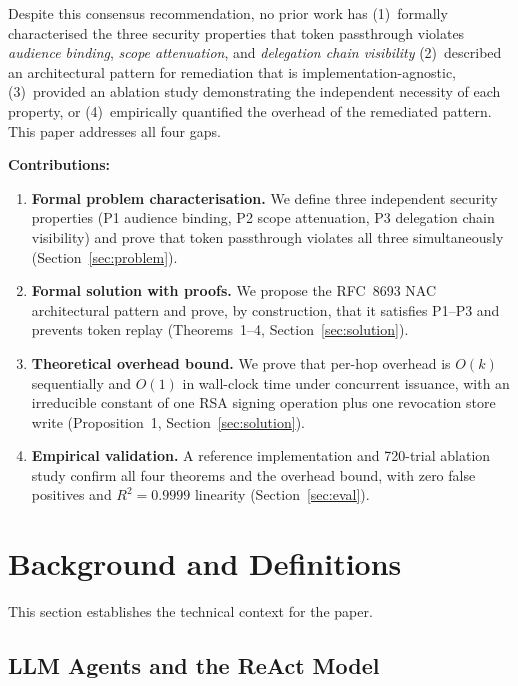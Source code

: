 \documentclass[journal]{IEEEtran}
\begin{document}
Despite this consensus recommendation, no prior work has (1)~formally
characterised the three security properties that token passthrough
violates \textit{audience binding}, \textit{scope attenuation}, and
\textit{delegation chain visibility} (2)~described an architectural pattern for
remediation that is implementation-agnostic, (3)~provided an ablation study
demonstrating the independent necessity of each property, or (4)~empirically
quantified the overhead of the remediated pattern. This paper addresses all four
gaps.

\textbf{Contributions:}
\begin{enumerate}
  \item \textbf{Formal problem characterisation.} We define three independent
        security properties (P1 audience binding, P2 scope attenuation, P3
        delegation chain visibility) and prove that token passthrough violates
        all three simultaneously (Section~\ref{sec:problem}).
  \item \textbf{Formal solution with proofs.} We propose the RFC~8693 NAC
        architectural pattern and prove, by construction, that it satisfies
        P1--P3 and prevents token replay (Theorems~1--4,
        Section~\ref{sec:solution}).
  \item \textbf{Theoretical overhead bound.} We prove that per-hop overhead is
        $O(k)$ sequentially and $O(1)$ in wall-clock time under concurrent
        issuance, with an irreducible constant of one RSA signing operation
        plus one revocation store write (Proposition~1,
        Section~\ref{sec:solution}).
  \item \textbf{Empirical validation.} A reference implementation and 720-trial
        ablation study confirm all four theorems and the overhead bound, with
        zero false positives and $R^2 = 0.9999$ linearity (Section~\ref{sec:eval}).
\end{enumerate}

\section{Background and Definitions}
\label{sec:background}

This section establishes the technical context for the paper.

\subsection{LLM Agents and the ReAct Model}
\end{document}
